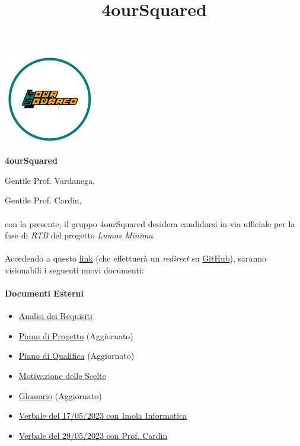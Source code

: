 \documentclass[12pt, a4paper]{article}
\begin{document}
\graphicspath{ {../../template} }
\title{4ourSquared}
\begin{center}
    \includegraphics[width=0.30\textwidth]{4ourSquared_logo}
\end{center}
\begin{center}
    {\Large \textbf{4ourSquared}}\\[24pt]
\end{center}


Gentile Prof. Vardanega,


Gentile Prof. Cardin,\\\\
con la presente, il gruppo 4ourSquared desidera candidarsi in via ufficiale per la fase di \textit{RTB} del progetto \textit{Lumos Minima}.\\\\
Accedendo a questo \href{https://github.com/4ourSquared/LumosMinima/tree/main/public}{link} (che effettuerà un \textit{redirect} su \href{https://github.com/}{GitHub}), saranno visionabili i seguenti nuovi documenti:
\paragraph{Documenti Esterni}
\begin{itemize}
    \item \href{https://github.com/4ourSquared/LumosMinima/tree/main/public/esterni/analisi_dei_requisiti.pdf}{Analisi dei Requisiti}
    \item \href{https://github.com/4ourSquared/LumosMinima/tree/main/public/esterni/piano_di_progetto.pdf}{Piano di Progetto} (Aggiornato)
    \item \href{https://github.com/4ourSquared/LumosMinima/tree/main/public/esterni/piano_di_qualifica.pdf}{Piano di Qualifica} (Aggiornato)
    \item \href{https://github.com/4ourSquared/LumosMinima/tree/main/public/esterni/motivazione_scelte.pdf}{Motivazione delle Scelte}
    \item \href{https://github.com/4ourSquared/LumosMinima/tree/main/public/esterni/glossario.pdf}{Glossario} (Aggiornato)
    \item \href{https://github.com/4ourSquared/LumosMinima/tree/main/public/esterni/verbali/2023_05_17_E.pdf}{Verbale del 17/05/2023 con Imola Informatica}
    \item \href{https://github.com/4ourSquared/LumosMinima/tree/main/public/esterni/verbali/2023_05_29_E.pdf}{Verbale del 29/05/2023 con Prof. Cardin}
\end{itemize}
\end{document}
